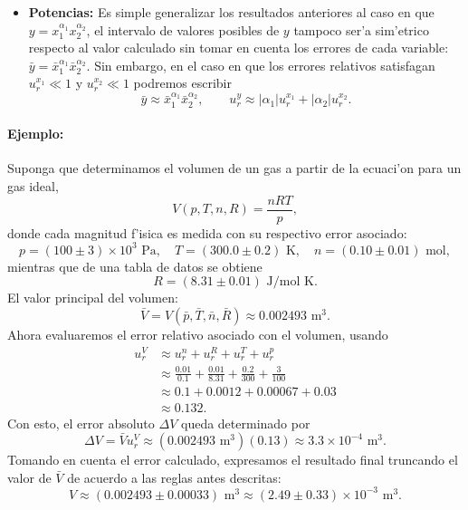 \documentclass[letterpaper,11pt]{report}
\begin{document}
\begin{itemize}
\item \textbf{Potencias:} Es simple generalizar los resultados anteriores al caso en que $y=x_1^{\alpha_1} x_2^{\alpha_2}$, el intervalo de valores posibles de $y$ tampoco ser'a sim'etrico respecto al valor calculado sin tomar en cuenta los errores de cada variable: $\bar{y}=\bar{x}_1^{\alpha_1}\bar{x}_2^{\alpha_2}$. Sin embargo, en el caso en que los errores relativos satisfagan $u_r^{x_1}\ll 1$ y $u_r^{x_2}\ll 1$ podremos escribir
\begin{equation}
\bar{y}\approx \bar{x}_1^{\alpha_1}\bar{x}_2^{\alpha_2}, \qquad  u_r^{y} \approx  |\alpha_1|u_r^{x_1} + |\alpha_2|u_r^{x_2}.
\end{equation}
\end{itemize}


\paragraph{Ejemplo:}
 Suponga que determinamos el volumen de un gas a partir de la ecuaci'on para un gas ideal,
\begin{equation}
V(p,T,n,R)=\frac{nRT}{p},
\end{equation}
donde cada magnitud f'isica es medida con su respectivo error asociado:
\begin{equation}
p=(100\pm 3)\times 10^3\text{ Pa}, \quad T=(300.0\pm 0.2)\text{ K}, 
\quad n=(0.10\pm 0.01)\text{ mol},
\end{equation}
mientras que de una tabla de datos se obtiene
\begin{equation}
R=(8.31\pm 0.01)\text{ J/mol K}.
\end{equation}
El valor principal del volumen:
\begin{equation}
\bar{V}= V(\bar{p},\bar{T},\bar{n},\bar{R}) \approx 0.002493\text{ m}^3.
\end{equation}
Ahora evaluaremos el error relativo asociado con el volumen, usando
\begin{align}
u_r^V &\approx u_r^n+ u_r^R + u_r^T + u_r^p \\
&\approx \frac{0.01}{0.1} + \frac{0.01}{8.31} + \frac{0.2}{300} + \frac{3}{100} \\
&\approx 0.1 + 0.0012 + 0.00067 + 0.03 \\
&\approx 0.132.
\end{align}
Con esto, el error absoluto $\Delta V$ queda determinado por
\begin{equation}
\Delta V = \bar{V}u_r^V \approx (0.002493\text{ m}^3)(0.13) \approx 3.3\times 10^{-4}\text{ m}^3.
\end{equation}
Tomando en cuenta el error calculado, expresamos el resultado final truncando el valor de $\bar{V}$ de acuerdo a las reglas antes descritas:
\begin{equation}
 V \approx (0.002493\pm 0.00033)\text{ m}^3 \approx (2.49\pm 0.33)\times 10^{-3}\text{ m}^3.
 \end{equation} 
\end{document}
